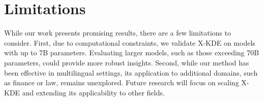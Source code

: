 \section*{Limitations}
While our work presents promising results, there are a few limitations to consider. First, due to computational constraints, we validate X-KDE on models with up to 7B parameters. Evaluating larger models, such as those exceeding 70B parameters, could provide more robust insights. Second, while our method has been effective in multilingual settings, its application to additional domains, such as finance or law, remains unexplored. Future research will focus on scaling X-KDE and extending its applicability to other fields.

